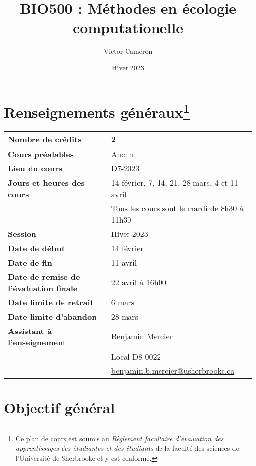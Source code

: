 \documentclass[12]{article}
\title{BIO500 : Méthodes en écologie computationelle}
\date {Hiver 2023}
\author {Victor Cameron}
\affil {Département de biologie \\
Université de Sherbrooke \\ 
Local D8-0012 \\ 
819-821-8000 \#61928}
\affil {\url{victor.cameron@usherbrooke.ca}}
\begin{document}
	\maketitle

	\section*{Renseignements généraux\footnote{Ce plan de cours est soumis au \textit{Règlement facultaire d'évaluation des apprentissages des étudiantes et des étudiants} de la faculté des sciences de l'Université de Sherbrooke et y est conforme.}} 
        
        \begin{center}
			\begin{tabular}{ m{22em} m{24em} }
				\hline
				\hline
				\textbf{Nombre de crédits} & 2 \\ 
				\hline
				\textbf{Cours préalables} & Aucun \\
				\hline
				\textbf{Lieu du cours} & D7-2023 \\
				\hline
				\textbf{Jours et heures des cours} & 14 février, 7, 14, 21, 28 mars, 4 et 11 avril \\ & Tous les cours sont le mardi de 8h30 à 11h30 \\
				\hline
				\textbf{Session} & Hiver 2023 \\
				\hline
				\textbf{Date de début} & 14 février \\
				\hline
				\textbf{Date de fin} & 11 avril \\
				\hline
				\textbf{Date de remise de l'évaluation finale} & 22 avril à 16h00 \\
				\hline
				\textbf{Date limite de retrait} & 6 mars \\
				\hline
				\textbf{Date limite d'abandon} & 28 mars \\
				\hline
				\textbf{Assistant à l'enseignement} & Benjamin Mercier \\ & Local D8-0022 \\ & \url{benjamin.b.mercier@usherbrooke.ca} \\
				\hline
				\hline
			\end{tabular}
        \end{center}

	\section*{Objectif général}
\end{document}
